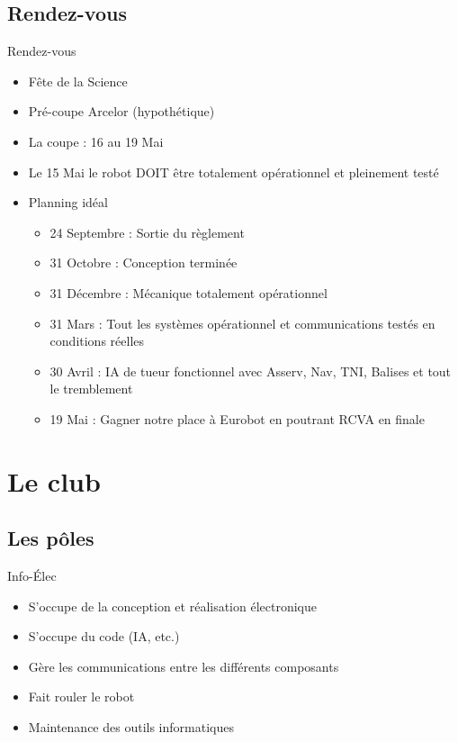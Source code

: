 \documentclass{beamer}
\begin{document}
\subsection{Rendez-vous}
\begin{frame}{Rendez-vous}
	\begin{itemize}
		\item Fête de la Science
		\item Pré-coupe Arcelor (hypothétique)
		\item La coupe : 16 au 19 Mai
		\item Le 15 Mai le robot DOIT être totalement opérationnel et pleinement testé
		\item Planning idéal
			\begin{itemize}
				\item 24 Septembre : Sortie du règlement
				\item 31 Octobre : Conception terminée
				\item 31 Décembre : Mécanique totalement opérationnel
				\item 31 Mars : Tout les systèmes opérationnel et communications testés en conditions réelles
				\item 30 Avril : IA de tueur fonctionnel avec Asserv, Nav, TNI, Balises et tout le tremblement
				\item 19 Mai : Gagner notre place à Eurobot en poutrant RCVA en finale
			\end{itemize}
	\end{itemize}
\end{frame}


\section{Le club}
\subsection{Les pôles}
\begin{frame}{Info-\'Elec}
	\begin{itemize}
		\item S'occupe de la conception et réalisation électronique
		\item S'occupe du code (IA, etc.)
		\item Gère les communications entre les différents composants
		\item Fait rouler le robot
		\item Maintenance des outils informatiques
	\end{itemize}
\end{frame}
\end{document}
